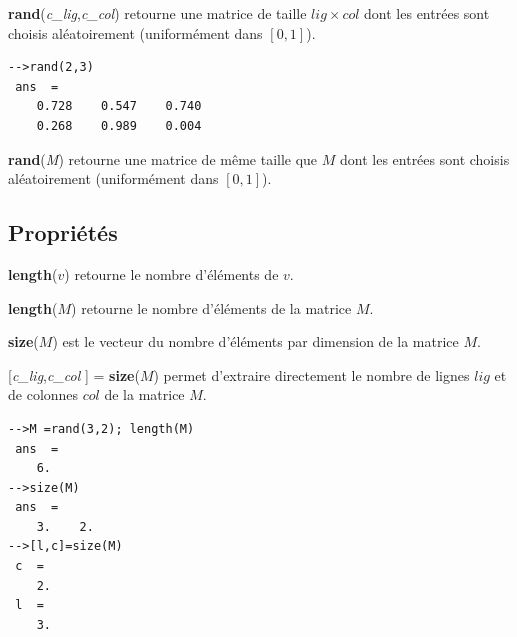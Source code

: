\documentclass{article}
\begin{document}
\begin{multicols}{3}
\begin{description}
\item{\textbf{rand}(\textit{c\_lig},\textit{c\_col})} retourne une matrice de taille $lig \times col$ dont les entrées sont choisis aléatoirement (uniformément dans $[0,1]$).
\begin{verbatim}
-->rand(2,3)
 ans  =
    0.728    0.547    0.740  
    0.268    0.989    0.004 
\end{verbatim}
\item{\textbf{rand}(\textit{M})} retourne une matrice de même taille que $M$ dont les entrées sont choisis aléatoirement (uniformément dans $[0,1]$).

\end{description}
\subsection*{Propriétés}
\begin{description}
\item{\textbf{length}($v$)} retourne le nombre d'éléments de $v$.
\item{\textbf{length}($M$)} retourne le nombre d'éléments de la matrice $M$.
\item{\textbf{size}($M$)} est le vecteur du nombre d'éléments par dimension de la matrice $M$.
\item{[\textit{c\_lig},\textit{c\_col} ] = \textbf{size}($M$)} permet d'extraire directement le nombre de lignes $lig$ et de colonnes $col$ de la matrice $M$.
\begin{verbatim}
-->M =rand(3,2); length(M)
 ans  =
    6.  
-->size(M)
 ans  =
    3.    2.  
-->[l,c]=size(M)
 c  =
    2.  
 l  =
    3.
\end{verbatim}
\end{description}

\end{multicols}
\end{document}
